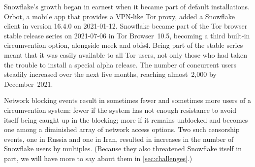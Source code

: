 \documentclass[letterpaper,twocolumn]{article}
\begin{document}
Snowflake's growth began in earnest
when it became part of default installations.
Orbot, a mobile app that provides a VPN-like Tor proxy,
added a Snowflake client in version 16.4.0
on \mbox{2021-01-12}.
Snowflake became part of the Tor browser stable release series
on \mbox{2021-07-06} in Tor Browser~10.5,
becoming a third built-in circumvention option,
alongside meek and obfs4.
Being part of the stable series meant that it was
easily available to all Tor users,
not only those who had taken the trouble to install a special alpha release.
The number of concurrent users steadily increased
over the next five months,
reaching almost~2,000 by December~2021.

Network blocking events result in sometimes fewer and
sometimes more users of a circumvention system:
fewer if the system has not enough resistance to avoid
itself being caught up in the blocking;
more if it remains unblocked and becomes one
among a diminished array of network access options.
Two such censorship events,
one in Russia and one in Iran,
resulted in increases in the number of Snowflake users
by multiples.
(Because they also threatened Snowflake itself in part,
we will have more to say about them in \autoref{sec:challenges}.)
\end{document}
